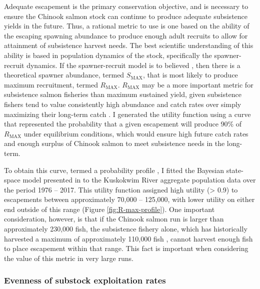 \documentclass[12pt,]{book}
\theoremstyle{definition}
\theoremstyle{definition}
\theoremstyle{definition}
\theoremstyle{remark}
\begin{document}
\noindent
Adequate escapement is the primary conservation objective, and is
necessary to ensure the Chinook salmon stock can continue to produce
adequate subsistence yields in the future. Thus, a rational metric to
use is one based on the ability of the escaping spawning abundance to
produce enough adult recruits to allow for attainment of subsistence
harvest needs. The best scientific understanding of this ability is
based in population dynamics of the stock, specifically the
spawner-recruit dynamics. If the \citet{ricker-1954} spawner-recruit
model is to believed \citep[as is often done in salmon population
analyses,][see Chapter \ref{ch4} as well]{fleischman-etal-2013}, then
there is a theoretical spawner abundance, termed \(S_{\text{MAX}}\),
that is most likely to produce maximum recruitment, termed
\(R_{\text{MAX}}\). \(R_{\text{MAX}}\) may be a more important metric
for subsistence salmon fisheries than maximum sustained yield, given
subsistence fishers tend to value consistently high abundance and catch
rates over simply maximizing their long-term catch
\citep{hamazaki-etal-2012}. I generated the utility function using a
curve that represented the probability that a given escapement will
produce 90\% of \(R_{\text{MAX}}\) under equilibrium conditions, which
would ensure high future catch rates and enough surplus of Chinook
salmon to meet subsistence needs in the long-term.

To obtain this curve, termed a probability profile
\citep{fleischman-etal-2013}, I fitted the Bayesian state-space model
presented in \citet{hamazaki-etal-2012} to the Kuskokwim River aggregate
population data over the period 1976 -- 2017. This utility function
assigned high utility (\textgreater{} 0.9) to escapements between
approximately 70,000 -- 125,000, with lower utility on either end
outside of this range (Figure \ref{fig:R-max-profile}). One important
consideration, however, is that if the Chinook salmon run is larger than
approximately 230,000 fish, the subsistence fishery alone, which has
historically harvested a maximum of approximately 110,000 fish
\citep{hamazaki-2011}, cannot harvest enough fish to place escapement
within that range. This fact is important when considering the value of
this metric in very large runs.

\subsubsection{Evenness of substock exploitation rates}\label{U-metric}
\end{document}

